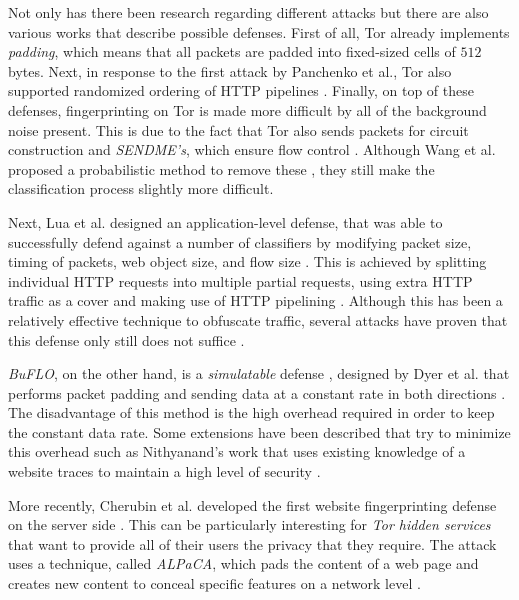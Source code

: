Not only has there been research regarding different attacks but there are also various works that describe possible defenses.
First of all, Tor already implements \textit{padding}, which means that all packets are padded into fixed-sized cells of $512$ bytes.
Next, in response to the first attack by Panchenko et al., Tor also supported randomized ordering of HTTP pipelines \cite{panchenko1, kfingerprinting, perry2011experimental}.
Finally, on top of these defenses, fingerprinting on Tor is made more difficult by all of the background noise present.
This is due to the fact that Tor also sends packets for circuit construction and \textit{SENDME's}, which ensure flow control \cite{panchenko2}.
Although Wang et al. proposed a probabilistic method to remove these \cite{wang_goldberg_2013}, they still make the classification process slightly more difficult.

Next, Lua et al. designed an application-level defense, that was able to successfully defend against a number of classifiers by modifying packet size, timing of packets, web object size, and
flow size \cite{perry2011experimental}. This is achieved by splitting individual HTTP requests into multiple partial requests, using extra HTTP traffic as a cover and making use of HTTP pipelining \cite{cai_zhang_joshi_johnson_2012}.
Although this has been a relatively effective technique to obfuscate traffic, several attacks have proven that this defense only still does not suffice \cite{cai_zhang_joshi_johnson_2012,wang_cai_johnson_nithyanand_goldberg_2014}.

\textit{BuFLO}, on the other hand, is a \textit{simulatable} defense \cite{wang_cai_johnson_nithyanand_goldberg_2014}, designed by Dyer et al. that performs packet padding and sending data at a constant rate in both directions \cite{dyer2012peek}.
The disadvantage of this method is the high overhead required in order to keep the constant data rate.
Some extensions have been described that try to minimize this overhead such as  Nithyanand's work that uses existing knowledge of a website traces to maintain a high level of security \cite{nithyanand2014glove}.

More recently, Cherubin et al. developed the first website fingerprinting defense on the server side \cite{cherubin2017website}.
This can be particularly interesting for \textit{Tor hidden services} that want to provide all of their users the privacy that they require.
The attack uses a technique, called \textit{ALPaCA}, which pads the content of a web page and creates new content to conceal specific features on a network level \cite{cherubin2017website}.

